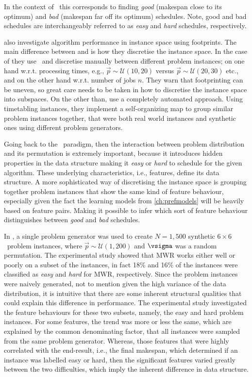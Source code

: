 In the context of \jsp\ this corresponds to finding \emph{good} (makespan close to its optimum)  and \emph{bad} (makespan far off its optimum) schedules. Note, good and bad schedules are interchangeably referred to as \emph{easy} and \emph{hard} schedules, respectively. 

\citet{SmithMilesLion5} also investigate algorithm performance in instance space using footprints. The main difference between \citeauthor{Corne10} and \citeauthor{SmithMilesLion5} is how they discretise the instance space. In the case of \citeauthor{Corne10} they use \jsp\ and discretise manually between different problem instances; on one hand w.r.t. processing times, e.g.,  $\vec{p}\sim \mathcal{U}(10,20)$ versus $\vec{p}\sim \mathcal{U}(20,30)$ etc., and on the other hand w.r.t. number of jobs $n$. 
They warn that footprinting can be uneven, so great care needs to be taken in how to discretise the instance space into subspaces. 
On the other than, \citeauthor{SmithMilesLion5} use a completely automated approach. Using timetabling instances, they implement a self-organizing map to group similar problem instances together, that were both real world instances and synthetic ones using different problem generators. 

Going back to the \jsp\ paradigm, then the interaction between problem distribution and its permutation is extremely important, because it introduces hidden properties in the data structure making it \emph{easy} or \emph{hard} to schedule for the given algorithm. These underlying characteristics, i.e., features, define its data structure. A more sophisticated way of discretising the instance space is grouping together problem instances that show the same kind of feature behaviour, especially given the fact the learning models from \cref{ch:prefmodels} will be heavily based on feature pairs. Making it possible to infer which sort of feature behaviour distinguishes  between \emph{good} and \emph{bad} schedules. 

In \citet{InRu12}, a single problem generator was used to create  $N=1,500$ synthetic $6\times6$ \jsp\ problem instances, where $\vec{p}\sim\mathcal{U}(1,200)$ and $\vsigma$ was a random permutation. The experimental study showed that MWR works either well or poorly on a subset of the instances, in fact 18\% and 16\% of the instances were classified as \emph{easy} and \emph{hard} for MWR, respectively. 
Since the problem instances were naively generated, not to mention given the high variance of the data distribution, it is intuitive that there are some inherent structural qualities that could explain this difference in performance. The experimental study investigated the feature behaviours for these two subsets, namely, the easy and hard problem instances. For some features, the trend was more or less the same, which are explained by the common denominating factor, that all instances were sampled from the same problem generator. Whereas, those features that were highly correlated with the end-result, i.e., the final makespan, which determined if an instance was labelled easy or hard, then the significant features varied greatly between the two difficulties, which imply the inherent difference in data structure. 

